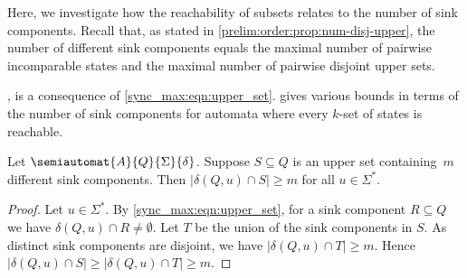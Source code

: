 
Here, we investigate how the reachability of subsets
relates to the number of sink components. Recall that, as stated in \cref{prelim:order:prop:num-disj-upper},
the number of different sink components
equals the maximal number of pairwise incomparable
states and the maximal number of pairwise disjoint upper sets.

,
is a consequence of \cref{sync_max:eqn:upper_set}.
gives various bounds in terms of the number
of sink components for automata where every $k$-set of states is reachable.

\begin{proposition} \label{syncmax:prop:uppersets-num-sinks}
	Let $\semiautomat{A}{Q}{\Sigma}{\delta}$.
	Suppose $S \subseteq Q$ is an upper set containing~$m$ different sink components.
    Then $|\delta(Q, u) \cap S| \ge m$ for all $u \in \Sigma^*$.
\end{proposition}
\begin{proof}
	Let $u \in \Sigma^*$. By \cref{sync_max:eqn:upper_set}, for a sink component $R \subseteq Q$
	we have $\delta(Q, u) \cap R \ne \emptyset$.
	Let $T$ be the union of the sink components in $S$.
    As distinct sink components are disjoint, we have $|\delta(Q, u) \cap T| \ge m$.
    Hence $|\delta(Q, u) \cap S| \ge |\delta(Q, u) \cap T| \ge m$.
\end{proof} 

